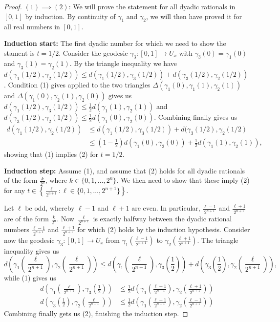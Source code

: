 \documentclass[11pt, a4paper, oneside]{memoir}
\theoremstyle{plain}\newtheorem{theorem}[subsection]{Theorem}
\theoremstyle{definition}
\begin{document}
\begin{proof}
\((1)\implies (2)\):
We will prove the statement for all dyadic rationals in \([0,1]\) by induction.
By continuity of \(\gamma_1\) and \(\gamma_2\), we will then have proved it for all real numbers in \([0,1]\).

\textbf{Induction start:}
The first dyadic number for which we need to show the stament is \(t=1/2\).
Consider the geodesic \(\gamma_3:[0,1]\to U_x\) with \(\gamma_3(0)=\gamma_1(0)\) and \(\gamma_3(1)=\gamma_2(1)\).
By the triangle inequality we have \(d(\gamma_1(1/2),\gamma_2(1/2))\leq d(\gamma_1(1/2),\gamma_3(1/2))+d(\gamma_3(1/2),\gamma_2(1/2))\).
Condition (1) gives applied to the two triangles \(\Delta(\gamma_1(0),\gamma_1(1),\gamma_2(1))\) and \(\Delta(\gamma_1(0),\gamma_2(1),\gamma_2(0))\) gives us \(d(\gamma_1(1/2),\gamma_3(1/2))\leq \frac{1}{2}d(\gamma_1(1),\gamma_2(1))\) and \(d(\gamma_3(1/2),\gamma_2(1/2))\leq \frac{1}{2}d(\gamma_1(0),\gamma_2(0))\).
Combining finally gives us
\begin{align*}
d(\gamma_1(1/2),\gamma_2(1/2))&\leq d(\gamma_1(1/2),\gamma_3(1/2))+d(\gamma_3(1/2),\gamma_2(1/2)\\
&\leq \left(1-\frac{1}{2}\right)d(\gamma_1(0),\gamma_2(0))+\frac{1}{2}d(\gamma_1(1),\gamma_2(1)),\end{align*}
showing that (1) implies (2) for \(t=1/2\).

\textbf{Induction step:}
Assume (1), and assume that (2) holds for all dyadic rationals of the form \(\frac{k}{2^n}\), where \(k\in\{0,1,\ldots,2^n\}\).
We then need to show that these imply (2) for any \(t\in\left\{\frac{\ell}{2^{n+1}}:\ell\in\{0,1,\ldots,2^{n+1}\}\right\}\).

Let \(\ell\) be odd, whereby \(\ell-1\) and \(\ell+1\) are even.
In particular, \(\frac{\ell-1}{2^{n+1}}\) and \(\frac{\ell+1}{2^{n+1}}\) are of the form \(\frac{k}{2^n}\).
Now \(\frac{\ell}{2^{n+1}}\) is exactly halfway between the dyadic rational numbers \(\frac{\ell-1}{2^{n+1}}\) and \(\frac{\ell+1}{2^{n+1}}\) for which (2) holds by the induction hypothesis.
Consider now the geodesic \(\gamma_3:[0,1]\to U_x\) from \(\gamma_1\left(\frac{\ell-1}{2^{n+1}}\right)\) to \(\gamma_2\left(\frac{\ell+1}{2^{n+1}}\right)\).
The triangle inequality gives us
\[d\left(\gamma_1\left(\frac{\ell}{2^{n+1}}\right),\gamma_2\left(\frac{\ell}{2^{n+1}}\right)\right)
\leq
d\left(\gamma_1\left(\frac{\ell}{2^{n+1}}\right),\gamma_3\left(\frac{1}{2}\right)\right)
+
d\left(\gamma_3\left(\frac{1}{2}\right),\gamma_2\left(\frac{\ell}{2^{n+1}}\right)\right),\]
while (1) gives us
\begin{align*}
d\left(\gamma_1\left(\frac{\ell}{2^{n+1}}\right),\gamma_3\left(\frac{1}{2}\right)\right)
&\leq
\frac{1}{2}d\left(\gamma_1\left(\frac{\ell+1}{2^{n+1}}\right),\gamma_2\left(\frac{\ell+1}{2^{n+1}}\right)\right)\\
d\left(\gamma_3\left(\frac{1}{2}\right),\gamma_2\left(\frac{\ell}{2^{n-1}}\right)\right)
&\leq
\frac{1}{2}d\left(\gamma_1\left(\frac{\ell-1}{2^{n+1}}\right),\gamma_2\left(\frac{\ell-1}{2^{n+1}}\right)\right)
\end{align*}
Combining finally gets us (2), finishing the induction step.



\end{proof}
\end{document}
